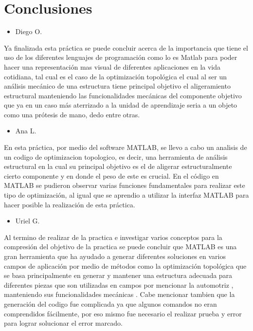 \documentclass{article}
\begin{document}
\clearpage
\section{Conclusiones}
\begin{itemize}
    \item Diego O.
\end{itemize}
Ya finalizada esta práctica se puede concluir  acerca de la importancia que tiene el uso de los diferentes lenguajes de programación como lo es Matlab para poder hacer una representación mas visual de diferentes aplicaciones en la vida cotidiana, tal cual es el caso de la optimización topológica el cual al ser un análisis mecánico de una estructura tiene principal objetivo el aligeramiento estructural manteniendo las funcionalidades mecánicas del componente objetivo que ya en un caso más aterrizado a la unidad de aprendizaje seria a un objeto como una prótesis de mano, dedo entre otras.

\begin{itemize}
    \item Ana L.
\end{itemize}
En esta práctica, por medio del software MATLAB, se llevo a cabo un analisis de un codigo de optimizacion topologico, es decir, una herramienta de análisis estructural en la cual su principal objetivo es el de aligerar estructuralmente cierto componente y en donde el peso de este es crucial. En el código en MATLAB se pudieron observar varias funciones fundamentales para realizar este tipo de optimización, al igual que se aprendio a utilizar la interfaz MATLAB para hacer posible la realización de esta práctica.

\begin{itemize}
    \item Uriel G.
\end{itemize}
Al termino de realizar de la practica e investigar varios conceptos para la compresión del objetivo de la practica se puede concluir que MATLAB es una gran herramienta que ha ayudado a generar diferentes soluciones en varios campos de aplicación por medio de métodos como la optimización topológica que se basa principalmente en generar y mantener una estructura adecuada para diferentes piezas que son utilizadas en campos por mencionar la automotriz , manteniendo sus funcionalidades mecánicas . Cabe mencionar tambien que la generación del codigo fue complicada ya que algunos comandos no eran comprendidos fácilmente, por eso mismo fue necesario el realizar prueba y error para lograr solucionar el error marcado.
\end{document}
